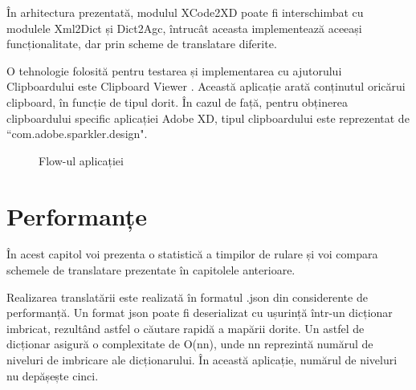 În arhitectura prezentată, modulul XCode2XD poate fi interschimbat cu modulele Xml2Dict și Dict2Agc, întrucât aceasta implementează aceeași funcționalitate, dar prin scheme de translatare diferite.


O tehnologie folosită pentru testarea și implementarea cu ajutorului Clipboardului este Clipboard Viewer \cite{clipboard}. Această aplicație arată conținutul oricărui clipboard, în funcție de tipul dorit. În cazul de față, pentru obținerea clipboardului specific aplicației Adobe XD, tipul clipboardului este reprezentat de ``com.adobe.sparkler.design".


\begin{figure}[!htbp]
\centering
{}
\caption{Flow-ul aplicației} \label{fig:Prezentare}
\end{figure}

\chapter{Performanțe}

În acest capitol voi prezenta o statistică a timpilor de rulare și voi compara schemele de translatare prezentate în capitolele anterioare.

Realizarea translatării este realizată în formatul .json din considerente de performanță. Un format json poate fi deserializat cu ușurință într-un dicționar imbricat, rezultând astfel o căutare rapidă a mapării dorite. Un astfel de dicționar asigură o complexitate de O(nn), unde nn reprezintă numărul de niveluri de imbricare ale dicționarului. În această aplicație, numărul de niveluri nu depășește cinci.  

